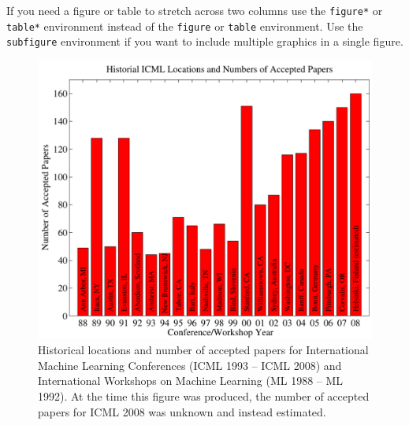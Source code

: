 \documentclass{article}
\begin{document}
If you need a figure or table to stretch across two columns use the \verb+figure*+ or \verb+table*+ environment instead of the \verb+figure+ or \verb+table+ environment.  Use the \verb+subfigure+ environment if you want to include multiple graphics in a single figure.

\begin{figure}[tb]
\vskip 5mm
\begin{center}
\centerline{\includegraphics[width=\columnwidth]{icml_numpapers}}
\caption{Historical locations and number of accepted papers for International
  Machine Learning Conferences (ICML 1993 -- ICML 2008) and
  International Workshops on Machine Learning (ML 1988 -- ML
  1992). At the time this figure was produced, the number of
  accepted papers for ICML 2008 was unknown and instead estimated.}
\label{fig:sample-graph}
\end{center}
\vskip -5mm
\end{figure} 
\end{document}
